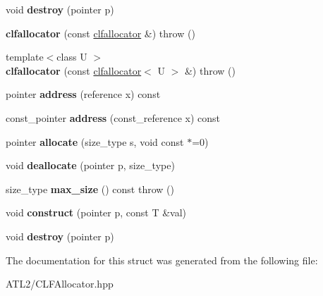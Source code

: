 \begin{DoxyCompactItemize}
\item 
\hypertarget{structatl_1_1clfallocator_a98e3deb0f4af68706a8e0f1e273387bd}{void {\bfseries destroy} (pointer p)}\label{structatl_1_1clfallocator_a98e3deb0f4af68706a8e0f1e273387bd}

\item 
\hypertarget{structatl_1_1clfallocator_a8928d061c1c2a1dbab013e7326bb069b}{{\bfseries clfallocator} (const \hyperlink{structatl_1_1clfallocator}{clfallocator} \&)  throw ()}\label{structatl_1_1clfallocator_a8928d061c1c2a1dbab013e7326bb069b}

\item 
\hypertarget{structatl_1_1clfallocator_a1f5a58370ba67cf8a646bb86e445fc67}{{\footnotesize template$<$class U $>$ }\\{\bfseries clfallocator} (const \hyperlink{structatl_1_1clfallocator}{clfallocator}$<$ U $>$ \&)  throw ()}\label{structatl_1_1clfallocator_a1f5a58370ba67cf8a646bb86e445fc67}

\item 
\hypertarget{structatl_1_1clfallocator_a7a8b1f5f859ebc1cd1f8509ad681164c}{pointer {\bfseries address} (reference x) const }\label{structatl_1_1clfallocator_a7a8b1f5f859ebc1cd1f8509ad681164c}

\item 
\hypertarget{structatl_1_1clfallocator_a54cd719ba718b880e8a804b8734ab710}{const\+\_\+pointer {\bfseries address} (const\+\_\+reference x) const }\label{structatl_1_1clfallocator_a54cd719ba718b880e8a804b8734ab710}

\item 
\hypertarget{structatl_1_1clfallocator_aea65f52c1c20d0ebfcca437beb865a5d}{pointer {\bfseries allocate} (size\+\_\+type s, void const $\ast$=0)}\label{structatl_1_1clfallocator_aea65f52c1c20d0ebfcca437beb865a5d}

\item 
\hypertarget{structatl_1_1clfallocator_adbb84b7714c54c46cf34ca8046b444fc}{void {\bfseries deallocate} (pointer p, size\+\_\+type)}\label{structatl_1_1clfallocator_adbb84b7714c54c46cf34ca8046b444fc}

\item 
\hypertarget{structatl_1_1clfallocator_a01b57d577ebda86a68dea5d97efafff9}{size\+\_\+type {\bfseries max\+\_\+size} () const   throw ()}\label{structatl_1_1clfallocator_a01b57d577ebda86a68dea5d97efafff9}

\item 
\hypertarget{structatl_1_1clfallocator_af3fde57bd7401696b232dac995de70e2}{void {\bfseries construct} (pointer p, const T \&val)}\label{structatl_1_1clfallocator_af3fde57bd7401696b232dac995de70e2}

\item 
\hypertarget{structatl_1_1clfallocator_a98e3deb0f4af68706a8e0f1e273387bd}{void {\bfseries destroy} (pointer p)}\label{structatl_1_1clfallocator_a98e3deb0f4af68706a8e0f1e273387bd}

\end{DoxyCompactItemize}


The documentation for this struct was generated from the following file\+:\begin{DoxyCompactItemize}
\item 
A\+T\+L2/C\+L\+F\+Allocator.\+hpp\end{DoxyCompactItemize}

